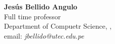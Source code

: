 \noindent \textbf{Jesús Bellido Angulo}\\ 
Full time professor \\
Department of Compuetr Science, \University, \city\\
email: \textit{jbellido@utec.edu.pe}\\


